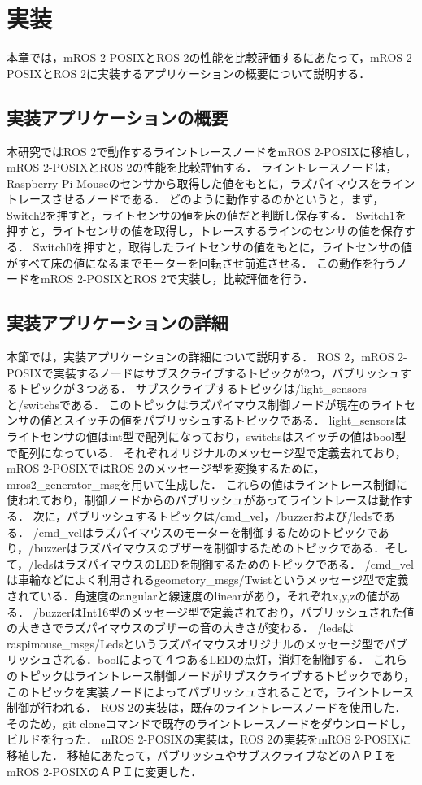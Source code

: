 \chapter{実装}
\label{chap:implementation}
本章では，mROS 2-POSIXとROS 2の性能を比較評価するにあたって，mROS 2-POSIXとROS 2に実装するアプリケーションの概要について説明する．
\section{実装アプリケーションの概要}
本研究ではROS 2で動作するライントレースノードをmROS 2-POSIXに移植し，mROS 2-POSIXとROS 2の性能を比較評価する．
ライントレースノードは，Raspberry Pi Mouseのセンサから取得した値をもとに，ラズパイマウスをライントレースさせるノードである．
どのように動作するのかというと，まず，Switch2を押すと，ライトセンサの値を床の値だと判断し保存する．
Switch1を押すと，ライトセンサの値を取得し，トレースするラインのセンサの値を保存する．
Switch0を押すと，取得したライトセンサの値をもとに，ライトセンサの値がすべて床の値になるまでモーターを回転させ前進させる．
この動作を行うノードをmROS 2-POSIXとROS 2で実装し，比較評価を行う．
\section{実装アプリケーションの詳細}
本節では，実装アプリケーションの詳細について説明する．
ROS 2，mROS 2-POSIXで実装するノードはサブスクライブするトピックが2つ，パブリッシュするトピックが３つある．
サブスクライブするトピックは/light\_sensorsと/switchsである．
このトピックはラズパイマウス制御ノードが現在のライトセンサの値とスイッチの値をパブリッシュするトピックである．
light\_sensorsはライトセンサの値はint型で配列になっており，switchsはスイッチの値はbool型で配列になっている．
それぞれオリジナルのメッセージ型で定義去れており，mROS 2-POSIXではROS 2のメッセージ型を変換するために，mros2\_generator\_msgを用いて生成した．
これらの値はライントレース制御に使われており，制御ノードからのパブリッシュがあってライントレースは動作する．
次に，パブリッシュするトピックは/cmd\_vel，/buzzerおよび/ledsである．
/cmd\_velはラズパイマウスのモーターを制御するためのトピックであり，/buzzerはラズパイマウスのブザーを制御するためのトピックである．そして，/ledsはラズパイマウスのLEDを制御するためのトピックである．
/cmd\_velは車輪などによく利用されるgeometory\_msgs/Twistというメッセージ型で定義されている．角速度のangularと線速度のlinearがあり，それぞれx,y,zの値がある．
/buzzerはInt16型のメッセージ型で定義されており，パブリッシュされた値の大きさでラズパイマウスのブザーの音の大きさが変わる．
/ledsはraspimouse\_msgs/Ledsというラズパイマウスオリジナルのメッセージ型でパブリッシュされる．boolによって４つあるLEDの点灯，消灯を制御する．
これらのトピックはライントレース制御ノードがサブスクライブするトピックであり，このトピックを実装ノードによってパブリッシュされることで，ライントレース制御が行われる．
ROS 2の実装は，既存のライントレースノードを使用した．
そのため，git cloneコマンドで既存のライントレースノードをダウンロードし，ビルドを行った．
mROS 2-POSIXの実装は，ROS 2の実装をmROS 2-POSIXに移植した．
移植にあたって，パブリッシュやサブスクライブなどのＡＰＩをmROS 2-POSIXのＡＰＩに変更した．
